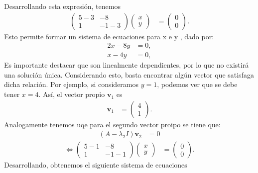 \documentclass[
  11pt,
  letterpaper,
   addpoints,
   answers
  ]{exam}
\begin{document}
\begin{questions}
\begin{solution}
    Desarrollando esta expresión, tenemos
    \begin{align}
        \begin{pmatrix}
        5 - 3 & -8 \\
        1 & -1 - 3
        \end{pmatrix}
        \begin{pmatrix}
        x \\
        y
        \end{pmatrix}
        &= \begin{pmatrix}
        0 \\
        0
        \end{pmatrix}.
    \end{align}
    Esto permite formar un sistema de ecuaciones para x e y , dado por:
    \begin{align}
        2x - 8y &= 0, \\
        x - 4y &= 0,
    \end{align}
    Es importante destacar que son linealmente dependientes, por lo que no existirá una solución única. Considerando esto, basta encontrar algún vector que satisfaga dicha relación. Por ejemplo, si consideramos \( y = 1 \), podemos ver que se debe tener \( x = 4 \). Así, el vector propio \( \mathbf{v}_1 \) es
    \begin{align}
        \mathbf{v}_1 &= \begin{pmatrix} 4 \\ 1 \end{pmatrix}.
    \end{align}
    Analogamente tenemos uqe para el segundo vector proipo se tiene que:
    \begin{align}
        (A - \lambda_2 I)\mathbf{v}_2 &= 0
    \end{align}
    \begin{align}
        \iff
        \begin{pmatrix}
        5 - 1 & -8 \\
        1 & -1 - 1
        \end{pmatrix}
        \begin{pmatrix}
        x \\
        y
        \end{pmatrix}
        &= \begin{pmatrix}
        0 \\
        0
        \end{pmatrix}.
    \end{align}
    Desarrollando, obtenemos el siguiente sistema de ecuaciones

\end{solution}
\end{questions}
\end{document}
